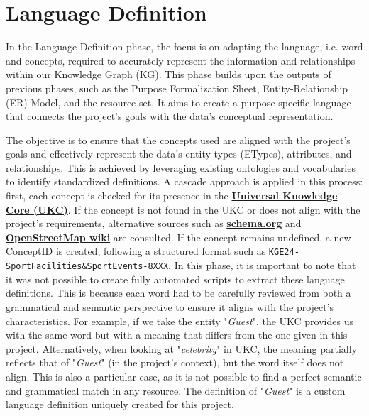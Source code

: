 \section{Language Definition}
\noindent In the Language Definition phase, the focus is on adapting the language, i.e. word and concepts, required to accurately represent the information and relationships within our Knowledge Graph (KG). This phase builds upon the outputs of previous phases, such as the Purpose Formalization Sheet, Entity-Relationship (ER) Model, and the resource set. It aims to create a purpose-specific language that connects the project's goals with the data's conceptual representation.
\vspace{0.4cm}

\noindent The objective is to ensure that the concepts used are aligned with the project’s goals and effectively represent the data’s entity types (ETypes), attributes, and relationships. This is achieved by leveraging existing ontologies and vocabularies to identify standardized definitions. A cascade approach is applied in this process: first, each concept is checked for its presence in the \href{https://ukc.datascientia.eu/concept}{\textbf{Universal Knowledge Core (UKC)}}. If the concept is not found in the UKC or does not align with the project’s requirements, alternative sources such as \href{https://schema.org}{\textbf{schema.org}} and \href{https://wiki.openstreetmap.org/wiki/Map_features}{\textbf{OpenStreetMap wiki}} are consulted. If the concept remains undefined, a new ConceptID is created, following a structured format such as \texttt{KGE24-SportFacilities\&SportEvents-8XXX}. In this phase, it is important to note that it was not possible to create fully automated scripts to extract these language definitions. This is because each word had to be carefully reviewed from both a grammatical and semantic perspective to ensure it aligns with the project's characteristics. For example, if we take the entity "\textit{Guest}", the UKC provides us with the same word but with a meaning that differs from the one given in this project. Alternatively, when looking at "\textit{celebrity}" in UKC, the meaning partially reflects that of "\textit{Guest}" (in the project's context), but the word itself does not align. This is also a particular case, as it is not possible to find a perfect semantic and grammatical match in any resource. The definition of "\textit{Guest}" is a custom language definition uniquely created for this project.
\vspace{0.4cm}


